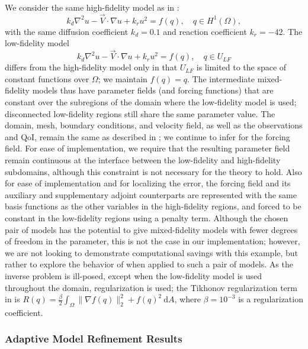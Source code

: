 \documentclass[review,sort&compress]{elsarticle}
\begin{document}
We consider the same high-fidelity model as in :
\begin{equation}
k_d\nabla^2 u - \vec{V}\cdot\nabla u + k_ru^2= f(q),\quad q\in H^1(\Omega),
\end{equation}
with the same diffusion coefficient $k_d = 0.1$  and reaction coefficient $k_r = -42$. The low-fidelity model
\begin{equation}
k_d\nabla^2 u - \vec{V}\cdot\nabla u + k_ru^2= f(q),\quad q\in U_{LF}
\end{equation}
differs from the high-fidelity model only in that $U_{LF}$ is limited to the space of constant functions over $\Omega$; we maintain $f(q)=q$. The intermediate mixed-fidelity models thus have parameter fields (and forcing functions) that are constant over the subregions of the domain where the low-fidelity model is used; disconnected low-fidelity regions still share the same parameter value. The domain, mesh, boundary conditions, and velocity field, as well as the observations and QoI, remain the same as described in ; we continue to infer for the forcing field. For ease of implementation, we require that the resulting parameter field remain continuous at the interface between the low-fidelity and high-fidelity subdomains, although this constraint is not necessary for the theory to hold. Also for ease of implementation and for localizing the error, the forcing field and its auxiliary and supplementary adjoint counterparts are represented with the same basis functions as the other variables in the high-fidelity regions, and forced to be constant in the low-fidelity regions using a penalty term. Although the chosen pair of models has the potential to give mixed-fidelity models with fewer degrees of freedom in the parameter, this is not the case in our implementation; however, we are not looking to demonstrate computational savings with this example, but rather to explore the behavior of  when applied to such a pair of models. As the inverse problem is ill-posed, except when the low-fidelity model is used throughout the domain, regularization is used; the Tikhonov regularization term in  is $R(q)=\frac{\beta}{2}\int_\Omega \|\nabla f(q)\|_2^2+f(q)^2\:\textrm{d}A$, where $\beta=10^{-3}$ is a regularization coefficient. 

\subsubsection{Adaptive Model Refinement Results}
\end{document}
